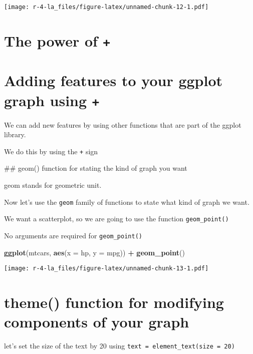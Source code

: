 \documentclass[
]{book}
\newenvironment{Shaded}{\begin{snugshade}}{\end{snugshade}}
\newcommand{\DataTypeTok}[1]{\textcolor[rgb]{0.13,0.29,0.53}{#1}}
\newcommand{\KeywordTok}[1]{\textcolor[rgb]{0.13,0.29,0.53}{\textbf{#1}}}
\newcommand{\NormalTok}[1]{#1}
\newcommand{\OperatorTok}[1]{\textcolor[rgb]{0.81,0.36,0.00}{\textbf{#1}}}
\newcommand{\StringTok}[1]{\textcolor[rgb]{0.31,0.60,0.02}{#1}}
\begin{document}
\texttt{[image: r-4-la\_files/figure-latex/unnamed-chunk-12-1.pdf]}

\hypertarget{the-power-of}{%
\section{\texorpdfstring{The power of \texttt{+}}{The power of +}}\label{the-power-of}}

\hypertarget{adding-features-to-your-ggplot-graph-using}{%
\section{\texorpdfstring{Adding features to your ggplot graph using \texttt{+}}{Adding features to your ggplot graph using +}}\label{adding-features-to-your-ggplot-graph-using}}

We can add new features by using other functions that are part of the ggplot
library.

We do this by using the \texttt{+} sign

\#\# geom() function for stating the kind of graph you want

geom stands for geometric unit.

Now let's use the \texttt{geom} family of functions to state what kind of graph we want.

We want a scatterplot, so we are going to use the function \texttt{geom\_point()}

No arguments are required for \texttt{geom\_point()}

\begin{Shaded}
\begin{Highlighting}[]
\KeywordTok{ggplot}\NormalTok{(mtcars, }\KeywordTok{aes}\NormalTok{(}\DataTypeTok{x =}\NormalTok{ hp, }\DataTypeTok{y =}\NormalTok{ mpg)) }\OperatorTok{+}\StringTok{ }
\StringTok{ }\KeywordTok{geom\_point}\NormalTok{() }
\end{Highlighting}
\end{Shaded}

\texttt{[image: r-4-la\_files/figure-latex/unnamed-chunk-13-1.pdf]}

\hypertarget{theme-function-for-modifying-components-of-your-graph}{%
\section{theme() function for modifying components of your graph}\label{theme-function-for-modifying-components-of-your-graph}}

let's set the size of the text by 20 using \texttt{text\ =\ element\_text(size\ =\ 20)}
\end{document}
